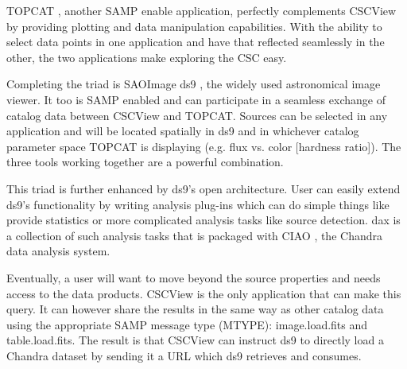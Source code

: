 TOPCAT \citep{2005ASPC..347...29T}, another SAMP enable application, perfectly complements CSCView by providing plotting and data manipulation capabilities.  With the ability to select data points in one application and have that reflected seamlessly in the other, the two applications make exploring the CSC easy.  

Completing the triad is SAOImage ds9 \citep{2003ASPC..295..489J}, the widely used astronomical image viewer. It too is SAMP enabled and can participate in a seamless exchange of catalog data between CSCView and TOPCAT.  Sources can be selected in any application and will be located spatially in ds9 and in whichever catalog parameter space TOPCAT is displaying (e.g. flux vs. color [hardness ratio]). The three tools working together are a powerful combination.  

 This triad is further enhanced by ds9's open architecture.  User can easily extend ds9's functionality by writing analysis plug-ins which can do simple things like provide statistics or more complicated analysis tasks like source detection.  dax \citep{2011ASPC..442..629G} is a collection of such analysis tasks that is packaged with CIAO \citep{2006SPIE.6270E..60F}, the Chandra data analysis system.


Eventually, a user will want to move beyond the source properties and needs access to the data products.  CSCView is the only application that can make this query.  It can however share the results in the same way as other catalog data using the appropriate SAMP message type (MTYPE): image.load.fits and table.load.fits. The result is that CSCView can instruct ds9 to directly load a Chandra dataset by sending it a URL which ds9 retrieves and consumes.



